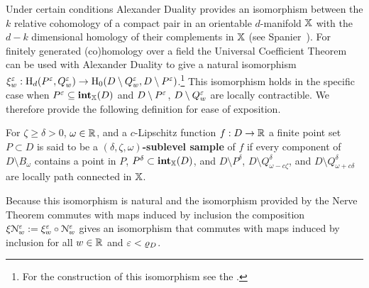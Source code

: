 Under certain conditions Alexander Duality provides an isomorphism between the $k$ relative cohomology of a compact pair in an orientable $d$-manifold $\mathbb{X}$ with the $d - k$ dimensional homology of their complements in $\mathbb{X}$ (see Spanier~\cite{spanier1989algebraic}).
For finitely generated (co)homology over a field the Universal Coefficient Theorem can be used with Alexander Duality to give a natural isomorphism $\xi_w^\varepsilon : \mathrm{H}_d(P^\varepsilon,Q_w^\varepsilon)\to \mathrm{H}_0(D\setminus Q_w^\varepsilon, D\setminus P^\varepsilon)$.\footnote{For the construction of this isomorphism see the \fullversion.}
This isomorphism holds in the specific case when $P^\varepsilon\subseteq \mathbf{int}_{\mathbb{X}}(D)$ and $D\setminus P^\varepsilon$, $D\setminus Q_w^\varepsilon$ are locally contractible.
We therefore provide the following definition for ease of exposition.
\begin{definition}
  For $\zeta\geq \delta > 0$, $\omega\in\mathbb{R}$, and a $c$-Lipschitz function $f: D\to \mathbb{R}$ a finite point set $P\subset D$ is said to be a \textbf{$(\delta, \zeta, \omega)$-sublevel sample} of $f$ if every component of $D\setminus B_\omega$ contains a point in $P$, $P^\delta\subset\mathbf{int}_{\mathbb{X}}(D)$, and $D\setminus P^\delta$, $D\setminus Q_{\omega-c\zeta}^\delta$, and $D\setminus Q_{\omega+c\delta}^\delta$ are locally path connected in $\mathbb{X}$.
\end{definition}
Because this isomorphism is natural and the isomorphism provided by the Nerve Theorem commutes with maps induced by inclusion the composition $\xi\mathcal{N}_w^\varepsilon := \xi_w^\varepsilon\circ\mathcal{N}_w^\varepsilon$ gives an isomorphism that commutes with maps induced by inclusion for all $w\in\mathbb{R}$ and $\varepsilon < \varrho_D$.

